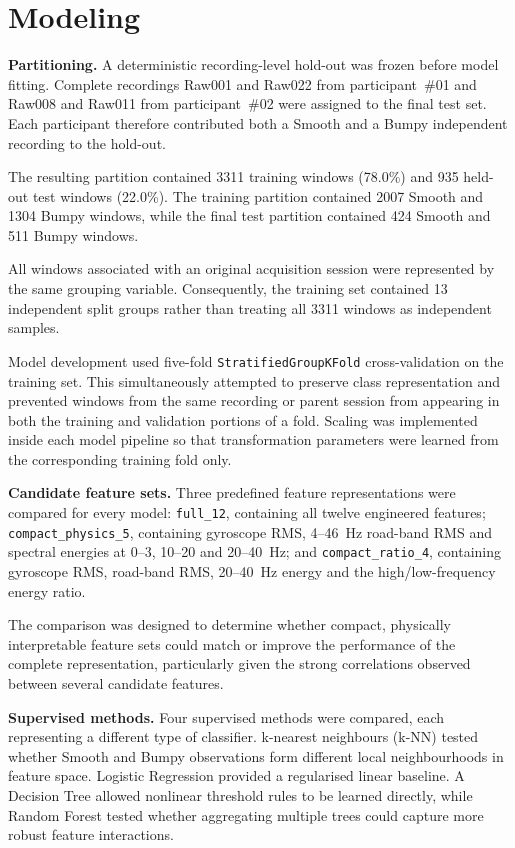 \section{Modeling}
\label{sec:modeling}
\textbf{Partitioning.}
A deterministic recording-level hold-out was frozen before model fitting.
Complete recordings Raw001 and Raw022 from participant~\#01 and Raw008 and
Raw011 from participant~\#02 were assigned to the final test set. Each
participant therefore contributed both a Smooth and a Bumpy independent
recording to the hold-out.

The resulting partition contained 3311 training windows (78.0\%) and
935 held-out test windows (22.0\%). The training partition contained
2007 Smooth and 1304 Bumpy windows, while the final test partition contained
424 Smooth and 511 Bumpy windows.

All windows associated with an original acquisition session were represented
by the same grouping variable. Consequently, the training set contained
13 independent split groups rather than treating all 3311 windows as
independent samples.

Model development used five-fold \texttt{StratifiedGroupKFold}
cross-validation on the training set. This simultaneously attempted to
preserve class representation and prevented windows from the same recording
or parent session from appearing in both the training and validation portions
of a fold. Scaling was implemented inside each model pipeline so that
transformation parameters were learned from the corresponding training fold
only.

\textbf{Candidate feature sets.}
Three predefined feature representations were compared for every model:
\texttt{full\_12}, containing all twelve engineered features;
\texttt{compact\_physics\_5}, containing gyroscope RMS, 4--46~Hz road-band
RMS and spectral energies at 0--3, 10--20 and 20--40~Hz; and
\texttt{compact\_ratio\_4}, containing gyroscope RMS, road-band RMS,
20--40~Hz energy and the high/low-frequency energy ratio.

The comparison was designed to determine whether compact,
physically interpretable feature sets could match or improve the performance
of the complete representation, particularly given the strong correlations
observed between several candidate features.

\textbf{Supervised methods.}
Four supervised methods were compared, each representing a different type of classifier.
k-nearest neighbours (k-NN) tested whether Smooth and Bumpy observations form
different local neighbourhoods in feature space. Logistic Regression provided
a regularised linear baseline. A Decision Tree allowed nonlinear threshold
rules to be learned directly, while Random Forest tested whether aggregating
multiple trees could capture more robust feature interactions.

